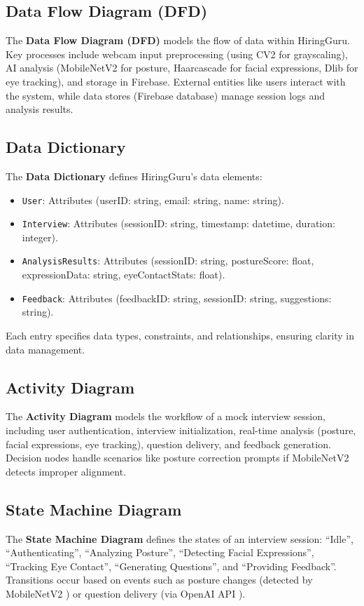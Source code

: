 \subsection{Data Flow Diagram (DFD)}
The \textbf{Data Flow Diagram (DFD)} models the flow of data within HiringGuru. Key processes include webcam input preprocessing (using CV2 for grayscaling), AI analysis (MobileNetV2 for posture, Haarcascade for facial expressions, Dlib for eye tracking), and storage in Firebase. External entities like users interact with the system, while data stores (Firebase database) manage session logs and analysis results.

\subsection{Data Dictionary}
The \textbf{Data Dictionary} defines HiringGuru’s data elements:
\begin{itemize}
    \item \texttt{User}: Attributes (userID: string, email: string, name: string).
    \item \texttt{Interview}: Attributes (sessionID: string, timestamp: datetime, duration: integer).
    \item \texttt{AnalysisResults}: Attributes (sessionID: string, postureScore: float, expressionData: string, eyeContactStats: float).
    \item \texttt{Feedback}: Attributes (feedbackID: string, sessionID: string, suggestions: string).
\end{itemize}
Each entry specifies data types, constraints, and relationships, ensuring clarity in data management.

\subsection{Activity Diagram}
The \textbf{Activity Diagram} models the workflow of a mock interview session, including user authentication, interview initialization, real-time analysis (posture, facial expressions, eye tracking), question delivery, and feedback generation. Decision nodes handle scenarios like posture correction prompts if MobileNetV2 detects improper alignment.

\subsection{State Machine Diagram}
The \textbf{State Machine Diagram} defines the states of an interview session: ``Idle'', ``Authenticating'', ``Analyzing Posture'', ``Detecting Facial Expressions'', ``Tracking Eye Contact'', ``Generating Questions'', and ``Providing Feedback''. Transitions occur based on events such as posture changes (detected by MobileNetV2 \cite{howard2018mobilenetv2}) or question delivery (via OpenAI API \cite{openai2023api}).

